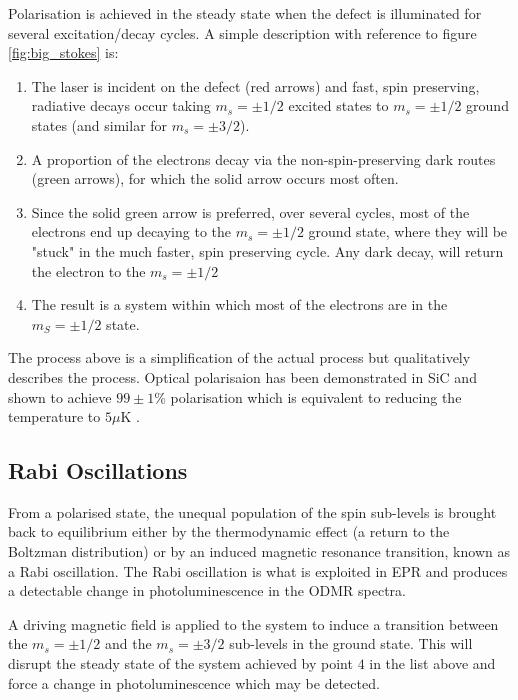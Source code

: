 Polarisation is achieved in the steady state when the defect is illuminated for several excitation/decay cycles. A simple description with reference to figure \ref{fig:big_stokes} is:
\begin{enumerate}
    \item The laser is incident on the defect (red arrows) and fast, spin preserving, radiative decays occur 
        taking $m_s = \pm1/2$ excited states to $m_s = \pm1/2$ ground states (and similar for $m_s = \pm3/2$). 
    \item A proportion of the electrons decay via the non-spin-preserving dark routes (green arrows), 
        for which the solid arrow occurs most often. 
    \item Since the solid green arrow is preferred, over several cycles, most of 
        the electrons end up decaying to the $m_s = \pm 1/2$ ground state, 
        where they will be "stuck" in the much faster, spin preserving cycle. Any dark decay, will return the electron to the $m_s = \pm 1/2$
    \item The result is a system within which most of the electrons are in the $m_S = \pm 1/2$ state. 
\end{enumerate}

The process above is a simplification of the actual process but qualitatively describes the process. Optical polarisaion has been demonstrated in SiC and shown to achieve $99 \pm 1$\% polarisation which is equivalent to reducing the temperature to $5 \mu$K
\cite{polarisation}
.

\subsection{Rabi Oscillations}
From a polarised state, the unequal population of the spin sub-levels is brought back to equilibrium either by the thermodynamic effect (a return to the Boltzman distribution) or by an induced magnetic resonance transition, known as a Rabi oscillation. The Rabi oscillation is what is exploited in EPR and produces a detectable change in photoluminescence in the ODMR spectra.

A driving magnetic field is applied to the system to induce a transition between the $m_s = \pm 1/2$ and the $m_s = \pm 3/2$ sub-levels in the ground state. This will disrupt the steady state of the system achieved by point $4$ in the list above and force a change in photoluminescence which may be detected. 

